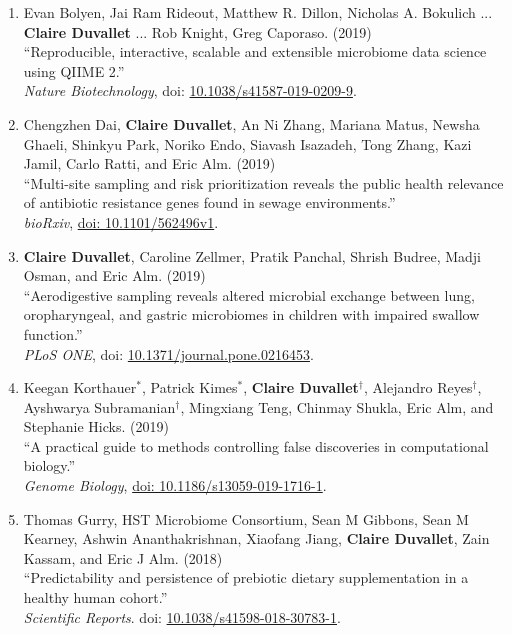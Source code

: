 \documentclass[10pt]{article}
\makeatletter
\newlength{\bibhang}
\newlength{\bibsep}
 {\@listi \global\bibsep\itemsep \global\advance\bibsep by\parsep}
\newenvironment{bibsection}%
        {\begin{enumerate}{}{%
       \setlength{\leftmargin}{\bibhang}%
       \setlength{\itemindent}{-\leftmargin}%
       \setlength{\itemsep}{\bibsep}%
       \setlength{\parsep}{\z@}%
        \setlength{\partopsep}{0pt}%
        \setlength{\topsep}{0pt}}}
        {\end{enumerate}\vspace{-.6\baselineskip}}
\makeatother
\begin{document}
\begin{bibsection}
		\item Evan Bolyen, Jai Ram Rideout, Matthew R. Dillon, Nicholas A. Bokulich ... \textbf{Claire Duvallet} ... Rob Knight, Greg Caporaso.   (2019) \\ 
		``Reproducible, interactive, scalable and extensible microbiome data science using QIIME 2.'' \\ 
		\textit{Nature Biotechnology}, doi: \href{https://doi.org/10.1038/s41587-019-0209-9}{10.1038/s41587-019-0209-9}.

	\item Chengzhen Dai, \textbf{Claire Duvallet}, An Ni Zhang, Mariana Matus, Newsha Ghaeli, Shinkyu Park, Noriko Endo, Siavash Isazadeh, Tong Zhang, Kazi Jamil, Carlo Ratti, and Eric Alm. (2019) \\
	``Multi-site sampling and risk prioritization reveals the public health relevance of antibiotic resistance genes found in sewage environments.''  \\
	\textit{bioRxiv},  \href{https://www.biorxiv.org/content/10.1101/562496v1}{doi: 10.1101/562496v1}.
					
	\item \textbf{Claire Duvallet}, Caroline Zellmer, Pratik Panchal, Shrish Budree, Madji Osman, and Eric Alm. (2019) \\ 
		``Aerodigestive sampling reveals altered microbial exchange between lung, oropharyngeal, and gastric microbiomes in children with impaired swallow function.'' \\ 
		\textit{PLoS ONE}, doi: \href{https://doi.org/10.1371/journal.pone.0216453}{10.1371/journal.pone.0216453}.
	
	\item Keegan Korthauer$^{*}$, Patrick Kimes$^{*}$, \textbf{Claire Duvallet}$^{\dagger}$,  Alejandro Reyes$^{\dagger}$,  Ayshwarya Subramanian$^{\dagger}$, Mingxiang Teng, Chinmay Shukla, Eric Alm, and Stephanie Hicks. (2019) \\
		``A practical guide to methods controlling false discoveries in computational biology.''  \\
		\textit{Genome Biology}, \href{https://doi.org/10.1186/s13059-019-1716-1}{doi: 10.1186/s13059-019-1716-1}.
		
	\item Thomas Gurry, HST Microbiome Consortium, Sean M Gibbons, Sean M Kearney, Ashwin Ananthakrishnan, Xiaofang Jiang, \textbf{Claire Duvallet}, Zain Kassam, and Eric J Alm. (2018) \\ 
		``Predictability and persistence of prebiotic dietary supplementation in a healthy human cohort.''  \\ 
		\emph{Scientific Reports}. doi: \href{https://doi.org/10.1038/s41598-018-30783-1}{10.1038/s41598-018-30783-1}.


\end{bibsection}
\end{document}

